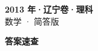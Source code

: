 \documentclass[zihao=-4, a4paper]{ctexart}
\begin{document}
\begin{center}
  {\Large\bfseries 2013 年·辽宁卷·理科}\\[4pt]
  {\large 数学 · 简答版}
\end{center}
\medskip
{}

\clearpage
{}
\begin{center}{\Large\bfseries 答案速查}\end{center}
\medskip

\end{document}
